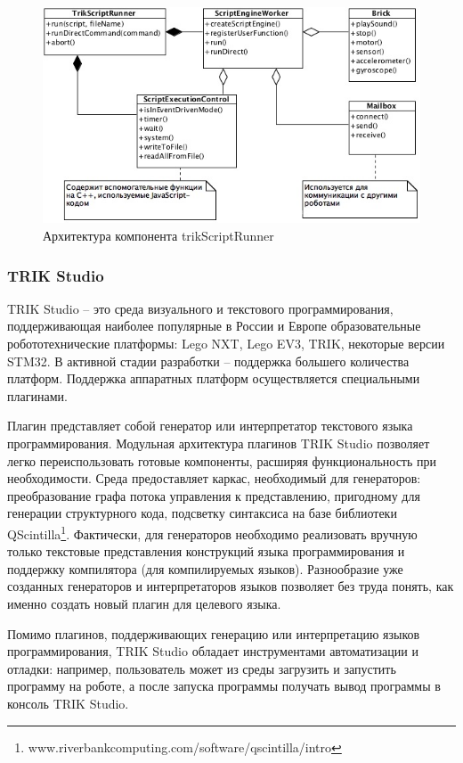 \documentclass[14pt]{matmex-diploma-custom}
\begin{document}
\begin{figure}[h]
	\includegraphics[width=\textwidth]{images/trikScriptRunner.jpg}
	\caption{Архитектура компонента trikScriptRunner}
	\label{trikScriptRunner}
\end{figure}

\subsubsection{TRIK Studio}
TRIK Studio -- это среда визуального и текстового программирования, поддерживающая наиболее популярные в России и Европе образовательные робототехнические платформы: Lego NXT, Lego EV3, TRIK, некоторые версии STM32. В активной стадии разработки -- поддержка большего количества платформ. Поддержка аппаратных платформ осуществляется специальными плагинами. 

Плагин представляет собой генератор или интерпретатор текстового языка программирования. Модульная архитектура плагинов TRIK Studio позволяет легко переиспользовать готовые компоненты, расширяя функциональность при необходимости. Среда предоставляет каркас, необходимый для генераторов: преобразование графа потока управления к представлению, пригодному для генерации структурного кода, подсветку синтаксиса на базе библиотеки QScintilla\footnote{www.riverbankcomputing.com/software/qscintilla/intro}. Фактически, для генераторов необходимо реализовать вручную только текстовые представления конструкций языка программирования и поддержку компилятора (для компилируемых языков). Разнообразие уже созданных генераторов и интерпретаторов языков позволяет без труда понять, как именно создать новый плагин для целевого языка.

Помимо плагинов, поддерживающих генерацию или интерпретацию языков программирования, TRIK Studio обладает инструментами автоматизации и отладки: например, пользователь может из среды загрузить и запустить программу на роботе, а после запуска программы получать вывод программы в консоль TRIK Studio.
\end{document}
